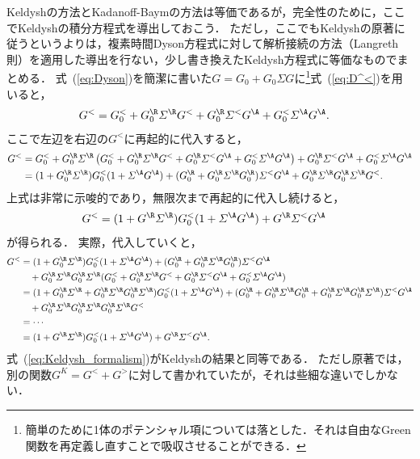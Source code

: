 \documentclass[a4paper,10pt]{jsarticle}
\begin{document}
Keldyshの方法とKadanoff-Baymの方法は等価であるが，完全性のために，ここでKeldyshの積分方程式を導出しておこう．
ただし，ここでもKeldyshの原著に従うというよりは，複素時間Dyson方程式に対して解析接続の方法（Langreth則）を適用した導出を行ない，少し書き換えたKeldysh方程式に等価なものでまとめる．
式~(\ref{eq:Dyson})を簡潔に書いた$G = G_0 + G_0 \varSigma G$に\footnote{簡単のために1体のポテンシャル項については落とした．それは自由なGreen関数を再定義し直すことで吸収させることができる．}式~(\ref{eq:D^<})を用いると，
\begin{align}
G^{<}
	& = G_0^{<}
		+ G_0^{\R} \varSigma^{\R} G^{<}
		+ G_0^{\R} \varSigma^{<} G^{\A}
		+ G_0^{<} \varSigma^{\A} G^{\A}
.\end{align}
ここで左辺を右辺の$G^{<}$に再起的に代入すると，
\begin{align}
G^{<}
	& = G_0^{<}
		+ G_0^{\R} \varSigma^{\R} \left( G_0^{<} + G_0^{\R} \varSigma^{\R} G^{<} + G_0^{\R} \varSigma^{<} G^{\A} + G_0^{<} \varSigma^{\A} G^{\A} \right)
		+ G_0^{\R} \varSigma^{<} G^{\A}
		+ G_0^{<} \varSigma^{\A} G^{\A}
\notag \\
	& = ( 1 + G_0^{\R} \varSigma^{\R} ) G_0^{<} ( 1 + \varSigma^{\A} G^{\A} )
		+ ( G_0^{\R} + G_0^{\R} \varSigma^{\R} G_0^{\R} ) \varSigma^{<} G^{\A}
		+ G_0^{\R} \varSigma^{\R} G_0^{\R} \varSigma^{\R} G^{<}
.\end{align}
上式は非常に示唆的であり，無限次まで再起的に代入し続けると，
\begin{align}
G^{<}
	& = ( 1 + G^{\R} \varSigma^{\R} ) G_0^{<} ( 1 + \varSigma^{\A} G^{\A} )
		+ G^{\R} \varSigma^{<} G^{\A}
\label{eq:Keldysh_formalism}
\end{align}
が得られる．
実際，代入していくと，
\begin{align*}
G^{<}
	& = ( 1 + G_0^{\R} \varSigma^{\R} ) G_0^{<} ( 1 + \varSigma^{\A} G^{\A} )
		+ ( G_0^{\R} + G_0^{\R} \varSigma^{\R} G_0^{\R} ) \varSigma^{<} G^{\A}
\\ & \hspace{1em}
		+ G_0^{\R} \varSigma^{\R} G_0^{\R} \varSigma^{\R} ( G_0^{<} + G_0^{\R} \varSigma^{\R} G^{<} + G_0^{\R} \varSigma^{<} G^{\A} + G_0^{<} \varSigma^{\A} G^{\A} )
\\ & =  ( 1 + G_0^{\R} \varSigma^{\R} + G_0^{\R} \varSigma^{\R} G_0^{\R} \varSigma^{\R} ) G_0^{<} ( 1 + \varSigma^{\A} G^{\A} )
		+ ( G_0^{\R} + G_0^{\R} \varSigma^{\R} G_0^{\R} + G_0^{\R} \varSigma^{\R} G_0^{\R} \varSigma^{\R} ) \varSigma^{<} G^{\A}
\\ & \hspace{1em}
		+ G_0^{\R} \varSigma^{\R} G_0^{\R} \varSigma^{\R} G_0^{\R} \varSigma^{\R} G^{<}
\\	& = \cdots
\\	& = ( 1 + G^{\R} \varSigma^{\R} ) G_0^{<} ( 1 + \varSigma^{\A} G^{\A} )
		+ G^{\R} \varSigma^{<} G^{\A}
.\end{align*}
式~(\ref{eq:Keldysh_formalism})がKeldyshの結果と同等である．
ただし原著では，別の関数$G^{K} = G^{<} + G^{>}$に対して書かれていたが，それは些細な違いでしかない．
\end{document}
